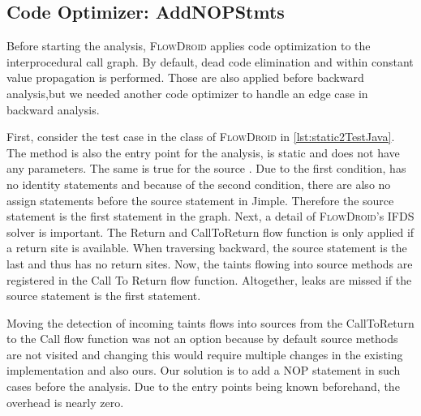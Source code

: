 \documentclass[../draft.tex]{subfiles}
\begin{document}
    \subsection{Code Optimizer: AddNOPStmts}
    Before starting the analysis, \textsc{FlowDroid} applies code optimization to the interprocedural call graph. By default, dead code elimination and within constant value propagation is performed. Those are also applied before backward analysis,but we needed another code optimizer to handle an edge case in backward analysis.

    First, consider the  test case in the  class of \textsc{FlowDroid} in \autoref{lst:static2TestJava}. The method is also the entry point for the analysis, is static and does not have any parameters. The same is true for the source . Due to the first condition,  has no identity statements and because of the second condition, there are also no assign statements before the source statement in Jimple. Therefore the source statement is the first statement in the graph. 
    Next, a detail of \textsc{FlowDroid}'s IFDS solver is important. The Return and CallToReturn flow function is only applied if a return site is available.
    When traversing backward, the source statement is the last and thus has no return sites. Now, the taints flowing into source methods are registered in the Call To Return flow function. Altogether, leaks are missed if the source statement is the first statement.

    Moving the detection of incoming taints flows into sources from the CallToReturn to the Call flow function was not an option because by default source methods are not visited and changing this would require multiple changes in the existing implementation and also ours. 
    Our solution is to add a NOP statement in such cases before the analysis. Due to the entry points being known beforehand, the overhead is nearly zero.
\end{document}
